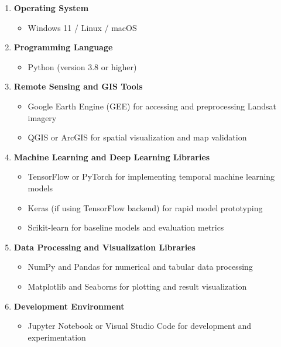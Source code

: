 \documentclass[main]{subfiles}
\begin{document}
\begin{enumerate}[label=\roman*.]
    \item \textbf{Operating System}
    \begin{itemize}
        \item Windows 11 / Linux / macOS
    \end{itemize}
    
    \item \textbf{Programming Language}
    \begin{itemize}
        \item Python (version 3.8 or higher)
    \end{itemize}
    
    \item \textbf{Remote Sensing and GIS Tools}
    \begin{itemize}
        \item Google Earth Engine (GEE) for accessing and preprocessing Landsat imagery
        \item QGIS or ArcGIS for spatial visualization and map validation
    \end{itemize}
    
    \item \textbf{Machine Learning and Deep Learning Libraries}
    \begin{itemize}
        \item TensorFlow or PyTorch for implementing temporal machine learning models
        \item Keras (if using TensorFlow backend) for rapid model prototyping
        \item Scikit-learn for baseline models and evaluation metrics
    \end{itemize}
    
    \item \textbf{Data Processing and Visualization Libraries}
    \begin{itemize}
        \item NumPy and Pandas for numerical and tabular data processing
        \item Matplotlib and Seaborns for plotting and result visualization
    \end{itemize}
    
    \item \textbf{Development Environment}
    \begin{itemize}
        \item Jupyter Notebook or Visual Studio Code for development and experimentation
    \end{itemize}
\end{enumerate}
\end{document}
